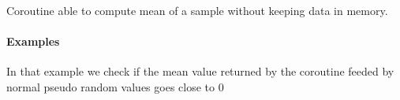 \documentclass[letterpaper,10pt,english]{sphinxmanual}
\begin{document}
\begin{fulllineitems}
\label{\detokenize{triflow.plugins:triflow.plugins.displays.amnesic_mean}}
Coroutine able to compute mean of a sample without keeping data in memory.
\paragraph{Examples}

In that example we check if the mean value returned by the coroutine feeded by normal pseudo random values goes close to 0

\begin{sphinxVerbatim}[commandchars=\\\{\}]
   
   
  
   
      
\end{sphinxVerbatim}

\end{fulllineitems}

\end{document}
